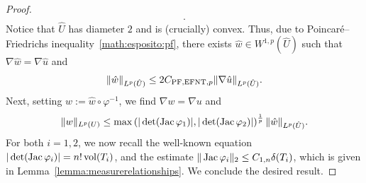 \documentclass[10pt,a4paper]{article}
\begin{document}
\begin{proof}
\begin{align*}
        .
    \end{align*}
    Notice that $\hat U$ has diameter $2$ and is (crucially) convex. 
    Thus, due to Poincar\'e--Friedrichs inequality~\eqref{math:esposito:pf}, there exists $\hat w \in W^{1,p}(\hat U)$ such that $\nabla \hat w = \nabla \hat u$ and 
    \begin{align*}
        \| \hat w \|_{L^{p}(\hat U)}
        \leq 
        2 C_{{\rm PF},{\rm EFNT},p}
        \| \nabla \hat u \|_{L^{p}(\hat U)}
        .
    \end{align*}
    Next, setting $w := \hat w \circ \varphi^{-1}$, we find $\nabla w = \nabla u$ and 
    \begin{align*}
        \| w \|_{L^{p}(U)}
        \leq 
        \max\left( 
            |\det(\operatorname{{\rm Jac}} \varphi_1)|
            ,
            |\det(\operatorname{{\rm Jac}} \varphi_2)|
        \right)^{\frac 1 p}
        \| \hat w \|_{L^{p}(\hat U)}
        .
    \end{align*}
    For both $i = 1,2$, we now recall the well-known equation $|\det(\operatorname{{\rm Jac}}\varphi_i)| = n! \operatorname{vol}(T_i)$, 
    and the estimate $\|  \operatorname{{\rm Jac}} \varphi_i  \|_{2} \leq C_{1,n} {\delta}(T_i)$, which is given in Lemma~\ref{lemma:measurerelationships}. We conclude the desired result.

\end{proof}
\end{document}
